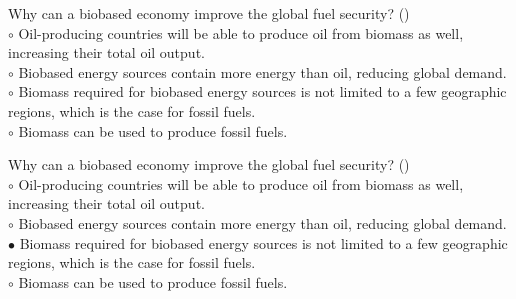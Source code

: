 \documentclass[]{beamer}
\begin{document}
\begin{CJK}{UTF8}{gbsn}
\begin{frame}[shrink] {}
\addtocounter{questions}{1}
\color{blue}
Why can a biobased economy improve the global fuel security?
({})\\
\color{black}
\setlength{\parindent}{-0.4cm}
{\color{red}$\circ$} Oil-producing countries will be able to produce oil from biomass as well, increasing their total oil output.  \\
{\color{red}$\circ$} Biobased energy sources contain more energy than oil, reducing global demand.  \\
{\color{red}$\circ$}  Biomass required for biobased energy sources is not limited to a few geographic regions, which is the case for fossil fuels.  \\
{\color{red}$\circ$} Biomass can be used to produce fossil fuels.   \\
\end{frame}
\begin{frame}[shrink] {}
\addtocounter{answers}{1}
\color{blue}
Why can a biobased economy improve the global fuel security?
({})\\
\color{black}
\setlength{\parindent}{-0.4cm}
{\color{red}$\circ$} Oil-producing countries will be able to produce oil from biomass as well, increasing their total oil output.  \\
{\color{red}$\circ$} Biobased energy sources contain more energy than oil, reducing global demand.  \\
{\color{red}$\bullet$} Biomass required for biobased energy sources is not limited to a few geographic regions, which is the case for fossil fuels.  \\
{\color{red}$\circ$} Biomass can be used to produce fossil fuels.   \\
\end{frame}



\end{CJK}
\end{document}

